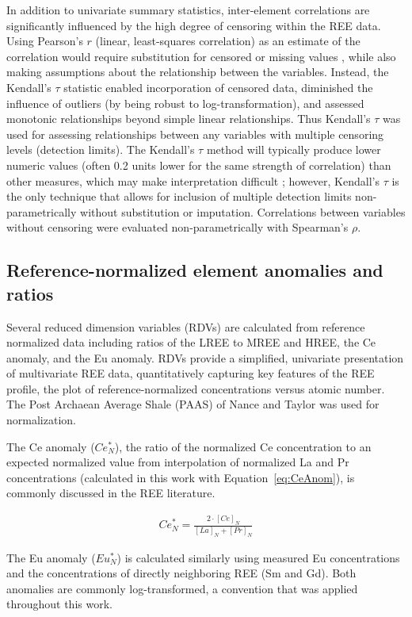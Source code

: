  
In addition to univariate summary statistics, inter-element correlations are significantly influenced by the high degree of censoring within the REE data.
Using Pearson's $r$ (linear, least-squares correlation) as an estimate of the correlation would require substitution for censored or missing values \citep{Helsel_EST_1995}, while also making assumptions about the relationship between the variables.
Instead, the Kendall's $\tau$ statistic enabled incorporation of censored data, diminished the influence of outliers (by being robust to log-transformation), and assessed monotonic relationships beyond simple linear relationships.
Thus Kendall's $\tau$ was used for assessing relationships between any variables with multiple censoring levels (detection limits).
The Kendall's $\tau$ method will typically produce lower numeric values (often 0.2 units lower for the same strength of correlation) than other measures, which may make interpretation difficult \citep{Helsel_book};
however, Kendall's $\tau$ is the only technique that allows for inclusion of multiple detection limits non-parametrically without substitution or imputation.
Correlations between variables without censoring were evaluated non-parametrically with Spearman's $\rho$.

\subsection{Reference-normalized element anomalies and ratios}

Several reduced dimension variables (RDVs) are calculated from reference normalized data including ratios of the LREE to MREE and HREE, the Ce anomaly, and the Eu anomaly.
RDVs provide a simplified, univariate presentation of multivariate REE data, quantitatively capturing key features of the REE profile, the plot of reference-normalized concentrations versus atomic number.
The Post Archaean Average Shale (PAAS) of Nance and Taylor \citep{PAAS} was used for normalization.

The Ce anomaly ($Ce_N^*$), the ratio of the normalized Ce concentration to an expected normalized value from interpolation of normalized La and Pr concentrations (calculated in this work with Equation~\ref{eq:CeAnom}), is commonly discussed in the REE literature.

\begin{align}\label{eq:CeAnom}
Ce_N^* = \frac{2\cdot [Ce]_N}{[La]_N + [Pr]_N}
\end{align}

The Eu anomaly ($Eu_N^*$) is calculated similarly using measured Eu concentrations and the concentrations of directly neighboring REE (Sm and Gd).
Both anomalies are commonly log-transformed, a convention that was applied throughout this work.

